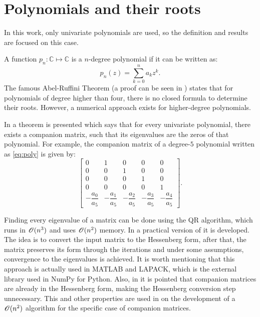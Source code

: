 \section{Polynomials and their roots}

In this work, only univariate polynomials are used, so the definition and results are focused on this case. 

A function $p_n: \mathbb{C} \mapsto \mathbb{C}$ is a $n$-degree polynomial if it can be written as:
\begin{equation}\label{eq:poly}
p_n(z) = \sum_{k=0}^{n} a_k z^k.
\end{equation}
The famous Abel-Ruffini Theorem (a proof can be seen in ) states that for polynomials of degree higher than four, there is no closed formula to determine their roots. However, a numerical approach exists for higher-degree polynomials.

 In  a theorem is presented which says that for every univariate polynomial, there exists a companion matrix, such that its eigenvalues are the zeros of that polynomial.  For example, the companion matrix of a degree-$5$ polynomial written as \autoref{eq:poly} is given by:
 \begin{equation}
 \left[\begin{array}{ccccc}
 0 & 1 & 0 & 0 & 0\\
 0 & 0 & 1 & 0 & 0\\
 0 & 0 & 0 & 1 & 0\\
 0 & 0 & 0 & 0 & 1\\
 -\dfrac{a_0}{a_5} & -\dfrac{a_1}{a_5} & -\dfrac{a_2}{a_5} & -\dfrac{a_3}{a_5} & -\dfrac{a_4}{a_5}
 \end{array}\right].
 \end{equation}
 
 Finding every eigenvalue of a matrix can be done using the QR algorithm, which runs in $\mathscr{O}(n^3)$ and uses $\mathscr{O}(n^2)$ memory. In \cite[p.~341]{golub} a practical version of it is developed. The idea is to convert the input matrix to the Hessenberg form, after that, the matrix preserves its form through the iterations and under some assumptions, convergence to the eigenvalues is achieved. It is worth mentioning that this approach is actually used in MATLAB and LAPACK, which is the external library used in NumPy for Python.
 Also, in  it is pointed that companion matrices are already in the Hessenberg form, making the Hessenberg conversion step unnecessary. This and other properties are used in  on the development of a $\mathscr{O}(n^2)$ algorithm for the specific case of companion matrices.
 
